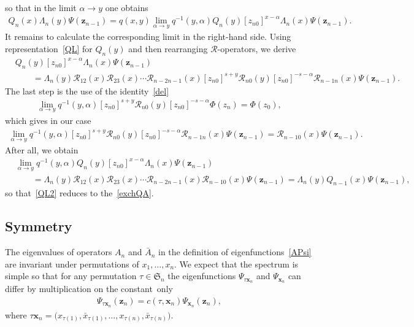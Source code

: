 \documentclass[10pt,a4paper]{amsart}
\numberwithin{equation}{section}
\begin{document}
so that in the limit $\alpha \to y$ one obtains
\begin{align}\label{QL2}
 Q_n( x) \Lambda_{n}(y) \Psi(\bm z_{n-1}) = q(x,y)
\lim\limits_{\alpha\to y}
q^{-1}(y,\alpha) Q_n(y)
[z_{n 0}]^{x-\alpha} \Lambda_{n}(x) \Psi(\bm z_{n-1}) .
\end{align}
It remains to calculate the corresponding limit
in the right-hand side. Using representation~\eqref{QL} for $Q_n(y)$ and
then rearranging $\mathcal{R}$-operators, we derive
\begin{align*}
&
Q_n(y)
[z_{n 0}]^{x-\alpha} \Lambda_{n}(x) \Psi(\bm z_{n-1}) \\
&\qquad{} =
\Lambda_n(y) \mathcal{R}_{12}(x)\mathcal{R}_{23}(x)\cdots
\mathcal{R}_{n-2 n-1}(x)
[z_{n0}]^{s+y} \mathcal{R}_{n 0}(y) [z_{n0}]^{-s-\alpha}
\mathcal{R}_{n-1 n}(x) \Psi(\bm z_{n-1}) .
\end{align*}
The last step is the use of the identity~\eqref{del}
\begin{align*}
\lim\limits_{\alpha\to y}
q^{-1}(y,\alpha)
[z_{n0}]^{s+y} \mathcal{R}_{n 0}(y) [z_{n0}]^{-s-\alpha} \Phi(z_n) =
\Phi(z_0),
\end{align*}
which gives in our case
\begin{align*}
\lim\limits_{\alpha\to y}
q^{-1}(y,\alpha)
[z_{n0}]^{s+y} \mathcal{R}_{n 0}(y) [z_{n0}]^{-s-\alpha}
\mathcal{R}_{n-1 n}(x) \Psi(\bm z_{n-1}) =
\mathcal{R}_{n-1 0}(x) \Psi(\bm z_{n-1}) .
\end{align*}
After all, we obtain
\begin{align*}
&
\lim\limits_{\alpha\to y}
q^{-1}(y,\alpha) Q_n(y)
[z_{n 0}]^{x-\alpha} \Lambda_{n}(x) \Psi(\bm z_{n-1}) \\
&
\qquad{}= \Lambda_n(y) \mathcal{R}_{12}(x)\mathcal{R}_{23}(x)\cdots
\mathcal{R}_{n-2 n-1}(x) \mathcal{R}_{n-1 0}(x) \Psi(\bm z_{n-1}) =
\Lambda_n(y) Q_{n-1}(x) \Psi(\bm z_{n-1}) ,
\end{align*}
so that~\eqref{QL2} reduces to the~\eqref{exchQA}.



\subsection{Symmetry} \label{sect:PermSym}

The eigenvalues of operators $A_n$ and $\bar{A}_n$ in the
definition of eigenfunctions~\eqref{APsi} are invariant under
permutations of $x_1, \dots, x_n$.
We expect that the spectrum is simple so that for any
permutation $\tau \in \mathfrak{S}_n$ the eigenfunctions
$\Psi_{\tau \bm x_n}$ and $\Psi_{\bm x_n}$ can differ by
multiplication on the constant~only
\begin{align*}
\Psi_{\tau \bm x_n}(\bm z_n) =
c(\tau,\bm x_n) \Psi_{\bm x_n}(\bm z_n) ,
\end{align*}
where $\tau \bm x_n = \bigl(x_{\tau(1)},\bar{x}_{\tau(1)}, \dots , x_{\tau(n)},\bar{x}_{\tau(n)}\bigr)$.
\end{document}
